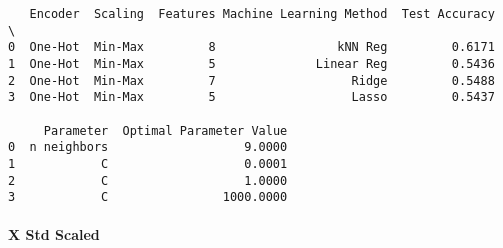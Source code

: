 \documentclass[11pt]{article}
\begin{document}
    
    \begin{verbatim}
   Encoder  Scaling  Features Machine Learning Method  Test Accuracy  \
0  One-Hot  Min-Max         8                 kNN Reg         0.6171   
1  One-Hot  Min-Max         5              Linear Reg         0.5436   
2  One-Hot  Min-Max         7                   Ridge         0.5488   
3  One-Hot  Min-Max         5                   Lasso         0.5437   

     Parameter  Optimal Parameter Value  
0  n neighbors                   9.0000  
1            C                   0.0001  
2            C                   1.0000  
3            C                1000.0000  
    \end{verbatim}

    
    \paragraph{X Std Scaled}\label{x-std-scaled}
\end{document}
